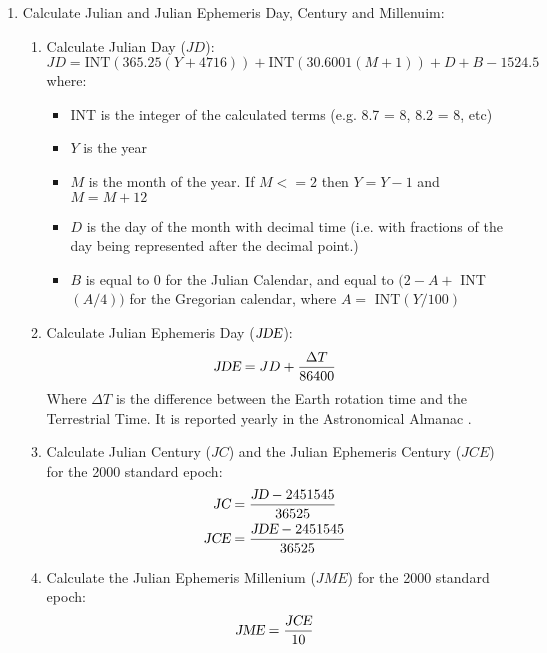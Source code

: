 { %
\begin{enumerate}
\item Calculate Julian and Julian Ephemeris Day, Century and Millenuim:
\begin{enumerate}
  \item Calculate Julian Day ($JD$):
  \begin{displaymath}
  JD = \text{INT}(365.25 (Y + 4716)) + \text{INT}(30.6001 (M + 1)) + D + B -1524.5
  \end{displaymath}
  where:
  \begin{itemize}
    \item INT is the integer of the calculated terms (e.g. 8.7 = 8, 8.2 = 8, etc)
    \item $Y$ is the year
    \item $M$ is the month of the year. If $M <= 2$ then $Y = Y - 1$ and $M = M + 12$
    \item $D$ is the day of the month with decimal time (i.e. with fractions of the day 
    being represented after the decimal point.)
    \item $B$ is equal to 0 for the Julian Calendar, and equal to $(2 - A + $ INT$(A/4))$ for the
    Gregorian calendar, where $A = $ INT$(Y/100)$
  \end{itemize}
  \item Calculate Julian Ephemeris Day ($\text{\sl JDE}$):
  \begin{displaymath}
  \text{\sl JDE} = JD + \frac{\Delta T}{86400}
  \end{displaymath}
  Where $\Delta T$ is the difference between the Earth rotation time and the Terrestrial Time.
  It is reported yearly in the Astronomical Almanac \cite{astrom}.

  \item Calculate Julian Century ($JC$) and the Julian Ephemeris Century ($JCE$) for the 2000 standard epoch:
  \begin{gather*}
  \text{\sl JC} = \frac{\text{\sl JD} - 2451545}{36525} \\
  \text{\sl JCE} = \frac{\text{\sl JDE} - 2451545}{36525}
  \end{gather*}

  \item Calculate the Julian Ephemeris Millenium ($JME$) for the 2000 standard epoch:
  \begin{displaymath}
  \text{\sl JME} = \frac{\text{\sl JCE}}{10}
  \end{displaymath}

\end{enumerate}



\end{enumerate}}
